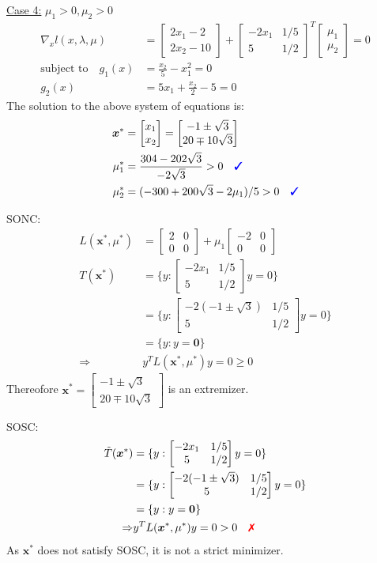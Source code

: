 \documentclass[a4paper,11pt]{article}
\newcommand{\V}[1]{\boldsymbol{#1}}
\newcommand{\mat}[1]{\begin{bmatrix}#1\end{bmatrix}}
\newcommand{\cmark}{{\color{blue}\text{\ding{51}}}}%
\newcommand{\xmark}{{\color{red}\text{\ding{55}}}}%
\begin{document}

\noindent\underline{Case 4:} $\mu_1>0, \mu_2>0$ 
\begin{align*}
 \nabla_x l(x,\lambda,\mu) &= \mat{2x_1 -2\\ 2x_2-10} +\mat{-2x_1 & 1/5\\ 5& 1/2}^T\mat{\mu_1\\ \mu_2} =0\\
 \text{subject to}\quad g_1(x)&=\frac{x_2}{5}-x_1^2 = 0\\
 g_2(x)&=5x_1 +\frac{x_2}{2}-5= 0
\end{align*}
The solution to the above system of equations is:
\begin{align*}
 \V{x}^* &= \mat{x_1\\x_2} = \mat{-1\pm\sqrt{3}\\ 20\mp10\sqrt{3}}\\
 \mu_1^* &= \frac{304-202\sqrt{3}}{-2\sqrt{3}}>0 \quad \cmark\\
 \mu_2^* &= (-300 + 200\sqrt{3} -2\mu_1)/5 >0 \quad\cmark
\end{align*}

\noindent SONC:
\begin{align*}
 L(\V{x}^*,\mu^*)& = \mat{2&0\\0&0} +\mu_1\mat{-2 & 0\\ 0& 0}\\
 T(\V{x}^*)&= \{y: \mat{-2x_1 & 1/5\\ 5&  1/2}y = 0 \}\\
 &= \{y: \mat{-2(-1\pm\sqrt{3})& 1/5\\ 5&  1/2}y = 0 \}\\
 &= \{y: y=\V{0}\}\\
 \Rightarrow& y^TL(\V{x}^*,\mu^*)y = 0 \geq 0
\end{align*}
Thereofore $\V{x}^*  = \mat{-1\pm\sqrt{3}\\ 20\mp10\sqrt{3}}$ is an extremizer.

\noindent SOSC:
\begin{align*}
 \tilde{T}(\V{x}^*)&= \{y: \mat{-2x_1 & 1/5\\ 5&  1/2}y = 0 \}\\
 &= \{y: \mat{-2(-1\pm\sqrt{3})& 1/5\\ 5&  1/2}y = 0 \}\\
 &= \{y: y=\V{0}\}\\
 \Rightarrow& y^TL(\V{x}^*,\mu^*)y = 0 > 0 \quad \xmark
\end{align*}
As $\V{x}^*$ does not satisfy SOSC, it is not a strict minimizer.
\end{document}
